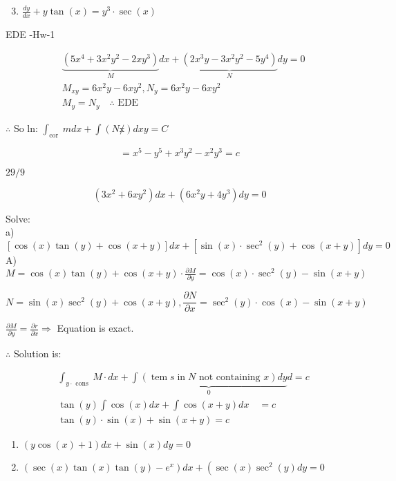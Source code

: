 \documentclass[12pt, a4paper]{article}
\begin{document}
\begin{enumerate}
  \setcounter{enumi}{2}
  \item $\frac{d y}{d x}+y \tan (x)=y^{3} \cdot \sec (x)$
\end{enumerate}

EDE -Hw-1

$$
\begin{aligned}
& \underbrace{\left(5 x^{4}+3 x^{2} y^{2}-2 x y^{3}\right)}_{M} d x+\underbrace{\left(2 x^{3} y-3 x^{2} y^{2}-5 y^{4}\right)}_{N} d y=0 \\
& M_{x y}=6 x^{2} y-6 x y^{2}, N_{y}=6 x^{2} y-6 x y^{2} \\
& M_{y}=N_{y} \quad \therefore \text { EDE }
\end{aligned}
$$

$\therefore$ So ln: $\int_{\text {cor }} m d x+\int(N \not x) d x y=C$

$$
=x^{5}-y^{5}+x^{3} y^{2}-x^{2} y^{3}=c
$$

$29 / 9$

$$
\left(3 x^{2}+6 x y^{2}\right) d x+\left(6 x^{2} y+4 y^{3}\right) d y=0
$$

Solve:\\
a) $[\cos (x) \tan (y)+\cos (x+y)] d x+\left[\sin (x) \cdot \sec ^{2}(y)+\cos (x+y)\right] d y=0$\\
A) $M=\cos (x) \tan (y)+\cos (x+y) \cdot \frac{\partial M}{\partial y}=\cos (x) \cdot \sec ^{2}(y)-\sin (x+y)$

$$
N=\sin (x) \sec ^{2}(y)+\cos (x+y), \frac{\partial N}{\partial x}=\sec ^{2}(y) \cdot \cos (x)-\sin (x+y)
$$

$\frac{\partial M}{\partial y}=\frac{\partial r}{\partial x} \Rightarrow$ Equation is exact.

$\therefore$ Solution is:

$$
\begin{aligned}
& \int_{y \cdot \text { cons }} M \cdot d x+\underbrace{\int(\operatorname{tem} s \operatorname{in} N \text { not containing } x) d y}_{0} d=c \\
& \tan (y) \int \cos (x) d x+\int \cos (x+y) d x \quad=c \\
& \tan (y) \cdot \sin (x)+\sin (x+y)=c
\end{aligned}
$$

\begin{enumerate}
  \item $(y \cos (x)+1) d x+\sin (x) d y=0$

  \item $\left(\sec (x) \tan (x) \tan (y)-e^{x}\right) d x+\left(\sec (x) \sec ^{2}(y) d y=0\right.$

\end{enumerate}
\end{document}
